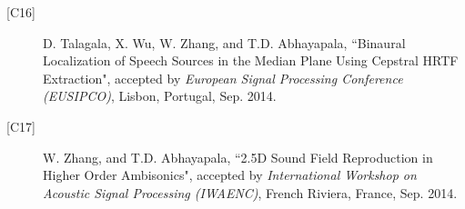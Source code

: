 \documentclass[11pt]{article}
\begin{document}
\begin{description}
\item[{[}C16{]}]D. Talagala, X. Wu, W. Zhang, and T.D. Abhayapala, ``Binaural Localization of Speech Sources in the Median Plane Using Cepstral HRTF Extraction", accepted by {\em European Signal Processing Conference (EUSIPCO)}, Lisbon, Portugal, Sep. 2014.

\item[{[}C17{]}]W. Zhang, and T.D. Abhayapala, ``2.5D Sound Field Reproduction in Higher Order Ambisonics", accepted by {\em International Workshop on Acoustic Signal Processing (IWAENC)}, French Riviera, France, Sep. 2014.

\end{description}
\end{document}
